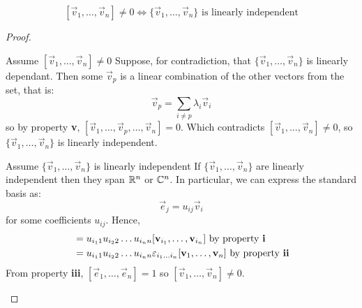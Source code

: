 \documentclass[../main.tex]{subfiles}
\begin{document}
\begin{proposition}
  \label{alternatingFormIndependent}
  \[
    [\vec{v}_1, \ldots, \vec{v}_n] \neq 0 \iff \{\vec{v}_1, \ldots, \vec{v}_n\} \text{ is linearly independent}
  \]
\end{proposition}
\begin{proof}
  \begin{proofdirection}{Assume $[\vec{v}_1, \ldots, \vec{v}_n] \neq 0$}
    Suppose, for contradiction, that $\{\vec{v}_1, \ldots, \vec{v}_n\}$ is linearly dependant.
    Then some $\vec{v}_p$ is a linear combination of the other vectors from the set, that is:
    \[
      \vec{v}_p = \sum_{i \neq p} \lambda_i \vec{v}_i
    \]
    so by property \textbf{v}, $[\vec{v}_1, \ldots, \vec{v}_p, \ldots, \vec{v}_n] = 0$.
    Which contradicts $[\vec{v}_1, \ldots, \vec{v}_n] \neq 0$, so $\{\vec{v}_1, \ldots, \vec{v}_n\}$ is linearly independent.
  \end{proofdirection}
  \begin{proofdirection}{Assume $\{\vec{v}_1, \ldots, \vec{v}_n\}$ is linearly independent}
    If $\{\vec{v}_1, \ldots, \vec{v}_n\}$  are linearly independent then they span $\mathbb{R}^{n}$ or $\mathbb{C}^{n}$.
    In particular, we can express the standard basis as:
    \[
      \vec{e}_j = u_{i j}\vec{v}_i
    \]
    for some coefficients $u_{i j}$.
    Hence,
    \begin{align*}
      [\vec{e}_1, \ldots, \vec{e}_n] &= u_{i_1 1} u_{i_2 2} \ldots u_{i_n n}[\vec{v}_{i_1}, \ldots, \vec{v}_{i_n}] \text{ by property \textbf{i}}\\
                                     &= u_{i_1 1} u_{i_2 2} \ldots u_{i_n n} \varepsilon_{i_1 \ldots i_n }[\vec{v}_{1}, \ldots, \vec{v}_{n}] \text{ by property \textbf{ii}}
    \end{align*}
    From property \textbf{iii}, $[\vec{e}_1, \ldots, \vec{e}_n] = 1$ so $[\vec{v}_{1}, \ldots, \vec{v}_{n}] \neq 0$.
  \end{proofdirection}
\end{proof}
\end{document}
